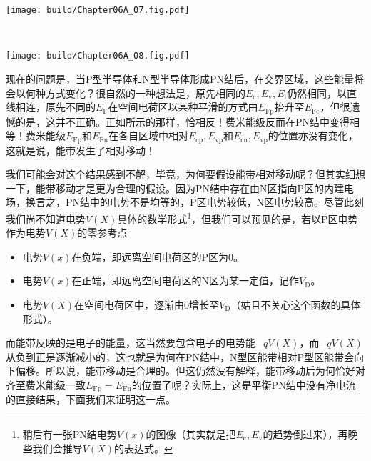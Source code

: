 \vspace{0.25cm}
\begin{Figure}[平衡PN结的能带图]
    \begin{FigureSub}[P型和N型半导体的能带图]
        \texttt{[image: build/Chapter06A\_07.fig.pdf]}
    \end{FigureSub}
    \\ \vspace{1cm}
    \begin{FigureSub}[PN结的能带图]
        \texttt{[image: build/Chapter06A\_08.fig.pdf]}
    \end{FigureSub}
\end{Figure}
现在的问题是，当P型半导体和N型半导体形成PN结后，在交界区域，这些能量将会以何种方式变化？很自然的一种想法是，原先相同的$E_\text{c},E_\text{v},E_\text{i}$仍然相同，以直线相连，原先不同的$E_\text{F}$在空间电荷区以某种平滑的方式由$E_\text{Fp}$抬升至$E_\text{Fc}$，但很遗憾的是，这并不正确。正如所示的那样，恰相反！费米能级反而在PN结中变得相等！费米能级$E_\text{Fp}$和$E_\text{Fn}$在各自区域中相对$E_\text{cp},E_\text{vp}$和$E_\text{cn},E_\text{vp}$的位置亦没有变化，这就是说，能带发生了相对移动！\goodbreak

我们可能会对这个结果感到不解，毕竟，为何要假设能带相对移动呢？但其实细想一下，能带移动才是更为合理的假设。因为PN结中存在由N区指向P区的内建电场，换言之，PN结中的电势不是均等的，P区电势较低，N区电势较高。尽管此刻我们尚不知道电势$V(X)$具体的数学形式\footnote{稍后有一张PN结电势$V(x)$的图像（其实就是把$E_\text{c},E_\text{v}$的趋势倒过来），再晚些我们会推导$V(X)$的表达式。}，但我们可以预见的是，若以P区电势作为电势$V(X)$的零参考点
\begin{itemize}
    \item 电势$V(x)$在负端，即远离空间电荷区的P区为$0$。
    \item 电势$V(x)$在正端，即远离空间电荷区的N区为某一定值，记作$V_\text{D}$。
    \item 电势$V(X)$在空间电荷区中，逐渐由$0$增长至$V_\text{D}$（姑且不关心这个函数的具体形式）。
\end{itemize}

而能带反映的是电子的能量，这当然要包含电子的电势能$-qV(X)$，而$-qV(X)$从负到正是逐渐减小的，这也就是为何在PN结中，N型区能带相对P型区能带会向下偏移。所以说，能带移动是合理的。但这仍然没有解释，能带移动后为何恰好对齐至费米能级一致$E_\text{Fp}=E_\text{Fn}$的位置了呢？实际上，这是平衡PN结中没有净电流的直接结果，下面我们来证明这一点。

